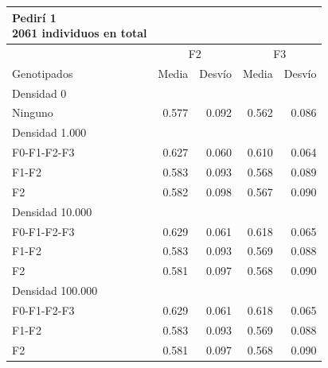 \documentclass[11pt,spanish,a4paper,oneside,]{book} %
\begin{document}
\captionsetup[table]{labelformat=empty,skip=1pt}
\begin{longtable}{lrrrr}
\caption*{
{\large Pedirí 1} \\ 
{\small 2061 individuos en total}
} \\ 
\toprule
 & \multicolumn{2}{c}{F2} & \multicolumn{2}{c}{F3} \\ 
 \cmidrule(lr){2-3} \cmidrule(lr){4-5}
Genotipados & Media & Desvío & Media & Desvío \\ 
\midrule
\multicolumn{1}{l}{Densidad 0} \\ 
\midrule
Ninguno & 0.577 & 0.092 & 0.562 & 0.086 \\ 
\midrule
\multicolumn{1}{l}{Densidad 1.000} \\ 
\midrule
F0-F1-F2-F3 & 0.627 & 0.060 & 0.610 & 0.064 \\ 
F1-F2 & 0.583 & 0.093 & 0.568 & 0.089 \\ 
F2 & 0.582 & 0.098 & 0.567 & 0.090 \\ 
\midrule
\multicolumn{1}{l}{Densidad 10.000} \\ 
\midrule
F0-F1-F2-F3 & 0.629 & 0.061 & 0.618 & 0.065 \\ 
F1-F2 & 0.583 & 0.093 & 0.569 & 0.088 \\ 
F2 & 0.581 & 0.097 & 0.568 & 0.090 \\ 
\midrule
\multicolumn{1}{l}{Densidad 100.000} \\ 
\midrule
F0-F1-F2-F3 & 0.629 & 0.061 & 0.618 & 0.065 \\ 
F1-F2 & 0.583 & 0.093 & 0.569 & 0.088 \\ 
F2 & 0.581 & 0.097 & 0.568 & 0.090 \\ 
 \bottomrule
\end{longtable}
\captionsetup[table]{labelformat=empty,skip=1pt}
\end{document}
